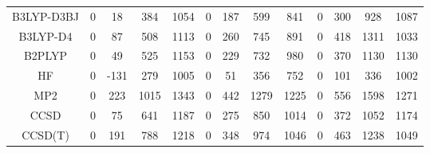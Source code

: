 \begin{table}[ht]
\begin{tabular}{ccccccccccccc}
B3LYP-D3BJ & 0 & 18 & 384 & 1054 & 0 & 187 & 599 & 841 & 0 & 300 & 928 & 1087 \\ 
B3LYP-D4 & 0 & 87 & 508 & 1113 & 0 & 260 & 745 & 891 & 0 & 418 & 1311 & 1033 \\ 
B2PLYP & 0 & 49 & 525 & 1153 & 0 & 229 & 732 & 980 & 0 & 370 & 1130 & 1130 \\ 
HF & 0 & -131 & 279 & 1005 & 0 & 51 & 356 & 752 & 0 & 101 & 336 & 1002 \\ 
MP2 & 0 & 223 & 1015 & 1343 & 0 & 442 & 1279 & 1225 & 0 & 556 & 1598 & 1271 \\ 
CCSD & 0 & 75 & 641 & 1187 & 0 & 275 & 850 & 1014 & 0 & 372 & 1052 & 1174 \\ 
CCSD(T) & 0 & 191 & 788 & 1218 & 0 & 348 & 974 & 1046 & 0 & 463 & 1238 & 1049 \\ 
\hline\hline
\end{tabular}
\end{table}